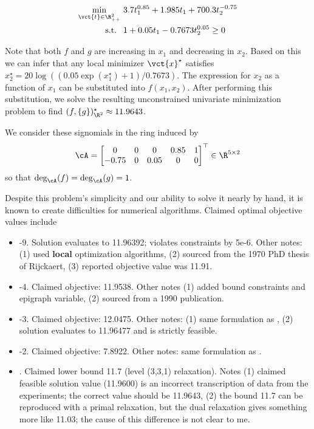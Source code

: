 
\begin{align*}
    \min_{\vct{t} \in \R^2_{++}} 
            &~    3.7 t_1^{0.85} + 1.985 t_1 + 700.3 t_2^{-0.75}                    \\
        \text{s.t. }    &~ 1 + 0.05 t_1 -0.7673 t_2^{0.05} \geq 0
\end{align*}


\iffalse

Note that both $f$ and $g$ are increasing in $x_1$ and decreasing in $x_2$.
Based on this we can infer that any local minimizer $\vct{x}^\star$ satisfies $x_2^\star = 20\log\left(( 0.05\exp(x_1^\star) + 1)/0.7673\right)$.
The expression for $x_2$ as a function of $x_1$ can be substituted into $f(x_1,x_2)$.
After performing this substitution, we solve the resulting unconstrained univariate minimization problem to find $(f,\{g\})_{\R^2}^\star \approx 11.9643$.

\vspace{1cm}

We consider these signomials in the ring induced by
\[
    \cA = \begin{bmatrix}
             0   &   0 &   0  &  0.85 &  1  \\
            -0.75  &  0  &  0.05 &  0   &  0  
            \end{bmatrix}^\top \in \R^{5 \times 2}
\]
so that $\deg_{\cA}(f) = \deg_{\cA}(g) = 1$.

Despite this problem's simplicity and our ability to solve it nearly by hand, it is known to create difficulties for numerical algorithms.
Claimed optimal objective values include
\begin{itemize}
    \item \cite{RM1978}-9. Solution evaluates to 11.96392; violates constraints by 5e-6. Other notes: (1) used \textbf{local} optimization algorithms, (2) sourced from the 1970 PhD thesis of Rijckaert, (3) reported objective value was 11.91.
    \item \cite{WL2005}-4. Claimed objective: 11.9538. Other notes (1) added bound constraints and epigraph variable, (2) sourced from a 1990 publication.
    \item \cite{Shen2008}-3.
    Claimed objective: 12.0475.
    Other notes: (1) same formulation as \cite{WL2005}, (2) solution evaluates to 11.96477 and is strictly feasible.
    \item \cite{HSC2014}-2. Claimed objective: 7.8922. Other notes: same formulation as \cite{Shen2008}.
    \item \cite{MCW2019}. Claimed lower bound 11.7 (level (3,3,1) relaxation). Notes (1) claimed feasible solution value (11.9600) is an incorrect transcription of data from the experiments; the correct value should be 11.9643, (2) the bound 11.7 can be reproduced with a primal relaxation, but the dual relaxation gives something more like 11.03; the cause of this difference is not clear to me.
\end{itemize}

